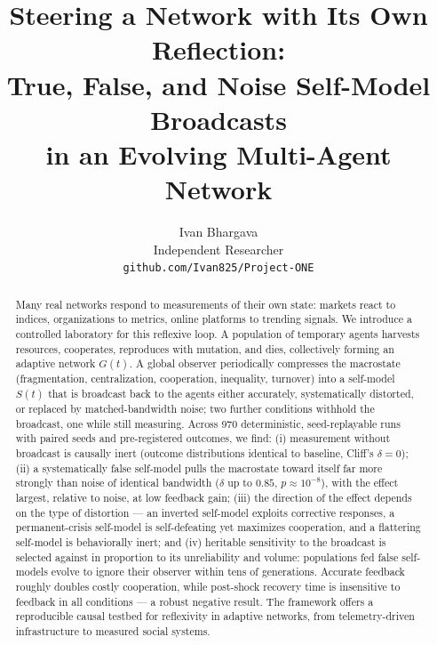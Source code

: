 \documentclass[10pt]{article}
\title{\bfseries Steering a Network with Its Own Reflection:\\
True, False, and Noise Self-Model Broadcasts\\ in an Evolving Multi-Agent Network}
\author{Ivan Bhargava\\[2pt]\small Independent Researcher\\
\small \texttt{github.com/Ivan825/Project-ONE}}
\date{}
\begin{document}
\maketitle

\begin{abstract}
Many real networks respond to measurements of their own state: markets react to
indices, organizations to metrics, online platforms to trending signals. We
introduce a controlled laboratory for this reflexive loop. A population of
temporary agents harvests resources, cooperates, reproduces with mutation, and
dies, collectively forming an adaptive network $G(t)$. A global observer
periodically compresses the macrostate (fragmentation, centralization,
cooperation, inequality, turnover) into a self-model $S(t)$ that is broadcast
back to the agents either accurately, systematically distorted, or replaced by
matched-bandwidth noise; two further conditions withhold the broadcast, one
while still measuring. Across 970 deterministic, seed-replayable runs with
paired seeds and pre-registered outcomes, we find: (i) measurement without
broadcast is causally inert (outcome distributions identical to baseline,
Cliff's $\delta=0$); (ii) a systematically false self-model pulls the
macrostate toward itself far more strongly than noise of identical bandwidth
($\delta$ up to $0.85$, $p\!\approx\!10^{-8}$), with the effect largest, relative
to noise, at low feedback gain; (iii) the direction of the effect depends on
the type of distortion --- an inverted self-model exploits corrective
responses, a permanent-crisis self-model is self-defeating yet maximizes
cooperation, and a flattering self-model is behaviorally inert; and (iv)
heritable sensitivity to the broadcast is selected against in proportion to its
unreliability and volume: populations fed false self-models evolve to ignore
their observer within tens of generations. Accurate feedback roughly doubles
costly cooperation, while post-shock recovery time is insensitive to feedback
in all conditions --- a robust negative result. The framework offers a
reproducible causal testbed for reflexivity in adaptive networks, from
telemetry-driven infrastructure to measured social systems.
\end{abstract}
\end{document}
